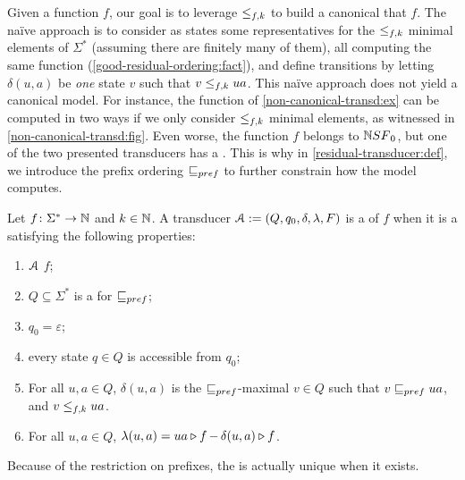 Given a function $f$, our goal is to leverage $\resleq{f}{k}$ to build a
canonical  that  $f$. The naïve
approach is to consider as states some representatives for the $\resleq{f}{k}$
minimal elements of $\Sigma^*$ (assuming there are finitely many of them), all
computing the same function (\cref{good-residual-ordering:fact}), and define
transitions by letting $\delta(u, a)$ be \emph{one} state $v$ such that $v
\resleq{f}{k} ua$. This naïve approach does not yield a canonical model. For
instance, the function of \cref{non-canonical-transd:ex} can be computed in two
ways if we only consider $\resleq{f}{k}$ minimal elements, as witnessed in
\cref{non-canonical-transd:fig}. Even worse, the function $f$ belongs to
$\NSF[0]$, but one of the two presented transducers has a . This is
why in \cref{residual-transducer:def}, we introduce the prefix ordering
$\prefleq$ to further constrain how the model computes.

\begin{definition}
    \label{residual-transducer:def}
    Let $f \colon \Sigma^* \to \Nat$ and $k \in \Nat$.
    A transducer $\aTransd \defined (Q, q_0, \delta, \lambda, F)$
    is a 
    of $f$ 
    when
    it is a 
    satisfying the following properties:
    \begin{enumerate}
        \item $\aTransd$  $f$;
        \item $Q \subseteq \Sigma^*$ is a 
            for $\prefleq$;
        \item $q_0 = \varepsilon$;
        \item every state $q \in Q$ is accessible from $q_0$;
        \item For all $u, a \in Q$,
            $\delta(u,a)$ is the $\prefleq$-maximal $v \in Q$
            such that $v \prefleq ua$, and $v \resleq{f}{k} ua$.
        \item For all $u,a \in Q$,
            $\lambda(u,a) = \app{f}{ua} - \app{f}{\delta(u,a)}$.
    \end{enumerate}
\end{definition}

Because of the restriction on prefixes, the 
is actually unique when it exists.


